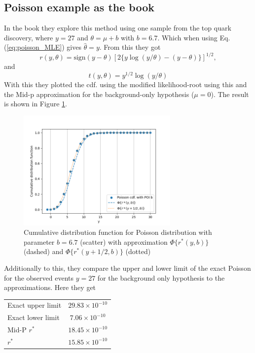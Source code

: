 \documentclass[14pt, a4paper]{article}  %
\begin{document}
\subsection{Poisson example as the book}
In the book they explore this method using one sample from the top quark discovery, where $y=27$ and $\theta=\mu+b$ with $b=6.7$. Which when using Eq. (\ref{eq:poisson_MLE}) gives $\hat{\theta}=y$. From this they got 
$$
r(y,\theta) = \text{sign}(y-\theta)[2\{y\log(y/\theta)-(y-\theta)\}]^{1/2},
$$
and 
$$
t(y,\theta)=y^{1/2}\log(y/\theta)
$$
With this they plotted the cdf. using the modified likelihood-root using this and the Mid-p  approximation for the background-only hypothesis ($\mu=0$). The result is shown in Figure  \ref{fig:book_cdf}.
\begin{figure}[!ht]
	\centering
        \includegraphics[width=0.7\textwidth]{Book_examples/book_cdf.png}
	\caption{Cumulative distribution function for Poisson distribution with parameter $b=6.7$ (scatter) with approximation $\Phi\{r^*(y,b)\}$ (dashed) and $\Phi\{r^*(y+1/2,b)\}$ (dotted)}\label{fig:book_cdf}
\end{figure} 
Additionally to this, they compare the upper and lower limit of the exact Poisson for the observed events $y=27$ for the background only hypothesis to the approximations. Here they get
\begin{table}[!ht]
    \centering
    \begin{tabular}{l|c}
         Exact upper limit & $29.83\times10^{-10}$ \\
         Exact lower limit & $7.06\times10^{-10}$ \\
         Mid-P $r^*$& $18.45\times10^{-10}$ \\
         $r^*$ & $15.85\times10^{-10}$\\
    \end{tabular}
\end{table}
\end{document}
